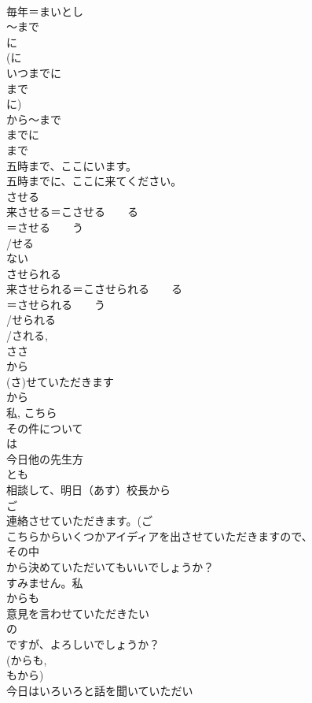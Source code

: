\documentclass[8pt]{extreport}
\begin{document}
\begin{CJK}{UTF8}{min}
\\	毎年＝まいとし
\\	～まで
\\	に　
\\	(に 
\\	いつまでに
\\	まで　
\\	に)
\\	から～まで
\\	までに
\\	まで 
\\	五時まで、ここにいます。
\\	五時までに、ここに来てください。	
\\	させる
\\	来させる＝こさせる　　る
\\	＝させる　　う
\\	/せる 
\\	ない 
\\	させられる
\\	来させられる＝こさせられる　　る
\\	＝させられる　　う
\\	/せられる　
\\	/される, 
\\	ささ 
\\	から
\\	(さ)せていただきます
\\	から 
\\	私, こちら 
\\	その件について
\\	は
\\	今日他の先生方
\\	とも
\\	相談して、明日（あす）校長から
\\	ご
\\	連絡させていただきます。(ご 
\\	こちらからいくつかアイディアを出させていただきますので、
\\	その中
\\	から決めていただいてもいいでしょうか？
\\	すみません。私
\\	からも
\\	意見を言わせていただきたい
\\	の
\\	ですが、よろしいでしょうか？
\\	(からも, 
\\	もから)
\\	今日はいろいろと話を聞いていただい

\end{CJK}
\end{document}
